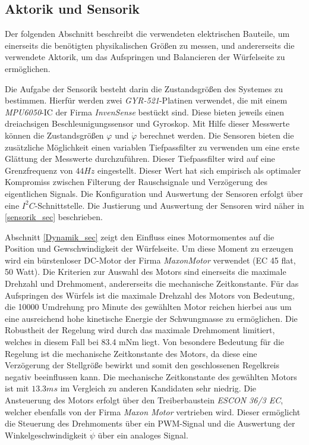 \subsection{Aktorik und Sensorik}
Der folgenden Abschnitt beschreibt die verwendeten elektrischen Bauteile, um einerseits die benötigten physikalischen Größen zu messen, und andererseits die verwendete Aktorik, um das Aufspringen und Balancieren der Würfelseite zu ermöglichen.
\newline 

Die Aufgabe der Sensorik besteht darin die Zustandsgrößen des Systemes zu bestimmen. Hierfür werden zwei \textit{GYR-521}-Platinen verwendet, die mit einem \textit{MPU6050}-IC der Firma \textit{InvenSense} bestückt sind. Diese bieten jeweils einen dreiachsigen Beschleunigungssensor und Gyroskop. Mit Hilfe dieser Messwerte können die Zustandsgrößen $\varphi$ und $\dot{\varphi}$ berechnet werden. Die Sensoren bieten die zusätzliche Möglichkeit einen variablen Tiefpassfilter zu verwenden um eine erste Glättung der Messwerte durchzuführen. Dieser Tiefpassfilter wird auf eine Grenzfrequenz von $44Hz$ eingestellt. Dieser Wert hat sich empirisch als optimaler Kompromiss zwischen Filterung der Rauschsignale und Verzögerung des eigentlichen Signals. Die Konfiguration und Auswertung der Sensoren erfolgt über eine $I^2C$-Schnittstelle. Die Justierung und Auswertung der Sensoren wird näher in \ref{sensorik_sec} beschrieben.
\newline

Abschnitt \ref{Dynamik_sec} zeigt den Einfluss eines Motormomentes auf die Position und Gewschwindigkeit der Würfelseite. Um diese Moment zu erzeugen wird ein bürstenloser DC-Motor der Firma \textit{MaxonMotor} verwendet (EC 45 flat, 50 Watt). Die Kriterien zur Auswahl des Motors sind einerseits die maximale Drehzahl und Drehmoment, andererseits die mechanische Zeitkonstante. Für das Aufspringen des Würfels ist die maximale Drehzahl des Motors von Bedeutung, die 10000 Umdrehung pro Minute des gewählten Motor reichen hierbei aus um eine ausreichend hohe kinetische Energie der Schwungmasse zu ermöglichen. Die Robustheit der Regelung wird durch das maximale Drehmoment limitiert, welches in diesem Fall bei 83.4 mNm liegt. Von besondere Bedeutung für die Regelung ist die mechanische Zeitkonstante des Motors, da diese eine Verzögerung der Stellgröße bewirkt und somit den geschlossenen Regelkreis negativ beeinflussen kann. Die mechanische Zeitkonstante des gewählten Motors ist mit $13.3ms$ im Vergleich zu anderen Kandidaten sehr niedrig. Die Ansteuerung des Motors erfolgt über den Treiberbaustein \textit{ESCON 36/3 EC}, welcher ebenfalls von der Firma \textit{Maxon Motor} vertrieben wird. Dieser ermöglicht die Steuerung des Drehmoments über ein PWM-Signal und die Auswertung der Winkelgeschwindigkeit $\dot{\psi}$ über ein analoges Signal.
\newline

